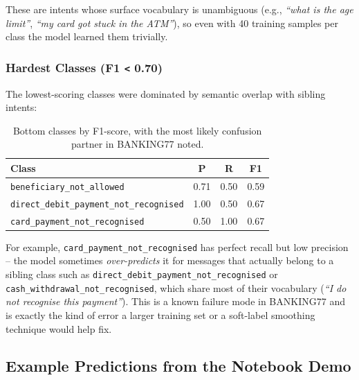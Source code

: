 \documentclass[12pt,a4paper]{article}
\begin{document}
These are intents whose surface vocabulary is unambiguous (e.g.,
\textit{``what is the age limit''}, \textit{``my card got stuck in the
ATM''}), so even with 40 training samples per class the model learned them
trivially.

\subsubsection*{Hardest Classes (F1 \texttt{<} 0.70)}

The lowest-scoring classes were dominated by semantic overlap with sibling
intents:

\begin{table}[H]
    \centering
    \caption{Bottom classes by F1-score, with the most likely confusion
    partner in BANKING77 noted.}
    \label{tab:hard-classes}
    \begin{tabular}{lccc}
        \toprule
        \textbf{Class}                                & \textbf{P}  & \textbf{R}  & \textbf{F1}  \\
        \midrule
        \texttt{beneficiary\_not\_allowed}            & 0.71        & 0.50        & 0.59         \\
        \texttt{direct\_debit\_payment\_not\_recognised} & 1.00     & 0.50        & 0.67         \\
        \texttt{card\_payment\_not\_recognised}       & 0.50        & 1.00        & 0.67         \\
        \bottomrule
    \end{tabular}
\end{table}

For example, \texttt{card\_payment\_\allowbreak not\_recognised} has perfect
recall but low precision -- the model sometimes \textit{over-predicts} it for
messages that actually belong to a sibling class such as
\texttt{direct\_debit\_\allowbreak payment\_not\_recognised} or
\texttt{cash\_withdrawal\_\allowbreak not\_recognised}, which share most of
their vocabulary (\textit{``I do not recognise this payment''}). This is a
known failure mode in BANKING77 and is exactly the kind of error a larger
training set or a soft-label smoothing technique would help fix.

\subsection{Example Predictions from the Notebook Demo}
\end{document}
